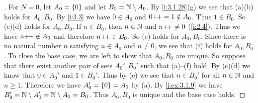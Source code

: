 \begin{proof}[]
  For \(N = 0\), let \(A_0 = \left\lbrace0\right\rbrace\) and let \(B_0 = \mathbb{N} \setminus A_0\).
  By \cref{i:3.1.28}(g) we see that (a)(b) holds for \(A_0, B_0\).
  By \cref{i:3.3} we have \(0 \in A_0\) and \(0{+}\!{+} = 1 \notin A_0\).
  Thus \(1 \in B_0\).
  So (c)(d) holds for \(A_0, B_0\).
  If \(n \in B_0\), then \(n \in \mathbb{N}\) and \(n{+}\!{+} \neq 0\) (\cref{i:2.4}).
  Thus we have \(n{+}\!{+} \notin A_0\) and therefore \(n{+}\!{+} \in B_0\).
  So (e) holds for \(A_0, B_0\).
  Since there is no natural number \(n\) satisfying \(n \in A_0\) and \(n \neq 0\), we see that (f) holds for \(A_0, B_0\).
  To close the base case, we are left to show that \(A_0, B_0\) are unique.
  So suppose that there exist another pair of sets \(A_0', B_0'\) such that (a)--(f) hold.
  By (c)(d) we know that \(0 \in A_0'\) and \(1 \in B_0'\).
  Thus by (e) we see that \(n \in B_0'\) for all \(n \in \mathbb{N}\) and \(n \geq 1\).
  Therefore we have \(A_0' = \left\lbrace0\right\rbrace = A_0\) by (a).
  By \cref{i:ex:3.1.9} we have \(B_0' = \mathbb{N} \setminus A_0' = \mathbb{N} \setminus A_0 = B_0\).
  Thus \(A_0, B_0\) is unique and the base case holds.


\end{proof}
